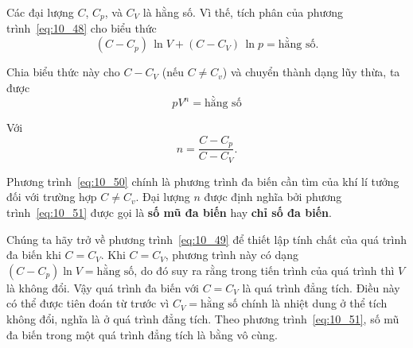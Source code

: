 
Các đại lượng $C$, $C_p$, và $C_V$ là hằng số. Vì thế, tích phân của phương trình~\eqref{eq:10_48} cho biểu thức  
\begin{equation}\label{eq:10_49}
	(C - C_p)\,\ln{V} + (C - C_V)\,\ln{p} = \text{hằng số}.
\end{equation}

\noindent

Chia biểu thức này cho $C-C_V$ (nếu $C\neq C_v$) và chuyển thành dạng lũy thừa, ta được
\begin{equation}\label{eq:10_50}
	pV^n = \text{hằng số}
\end{equation}

\noindent

Với 
\begin{equation}\label{eq:10_51}
	n = \frac{C - C_p}{C - C_V}.
\end{equation}


Phương trình~\eqref{eq:10_50} chính là phương trình đa biến cần tìm của khí lí tưởng đối với trường hợp $C\neq C_v$. Đại lượng $n$ được định nghĩa bởi phương trình~\eqref{eq:10_51} được gọi là \textbf{số mũ đa biến} hay \textbf{chỉ số đa biến}.


Chúng ta hãy trở về phương trình~\eqref{eq:10_49} để thiết lập tính chất của quá trình đa biến khi $C=C_V$. Khi $C=C_V$, phương trình này có dạng $(C-C_p)\ln{V}=\text{hằng số}$, do đó suy ra rằng trong tiến trình của quá trình thì $V$ là không đổi. Vậy quá trình đa biến với $C=C_V$ là quá trình đẳng tích. Điều này có thể được tiên đoán từ trước vì $C_V=\text{hằng số}$ chính là nhiệt dung ở thể tích không đổi, nghĩa là ở quá trình đẳng tích. Theo phương trình~\eqref{eq:10_51}, số mũ đa biến trong một quá trình đẳng tích là bằng vô cùng.   

